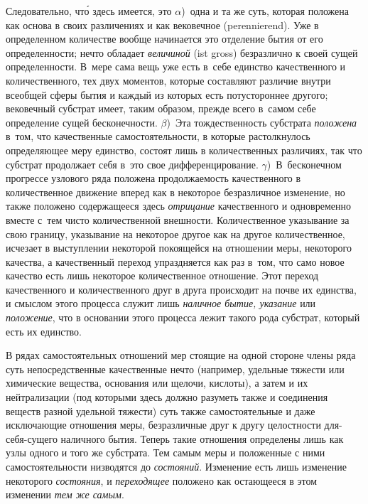 Следовательно, чт\'{о} здесь имеется, это $\alpha$)~одна и та же суть,
которая положена как основа в своих различениях и как вековечное
(peren\-nie\-rend). Уже в определенном количестве вообще начинается это
отделение бытия от его определенности; нечто обладает {\em величиной} (ist
gross) безразлично к своей сущей определенности. В~мере сама вещь уже есть
в~себе единство качественного и количественного, тех двух моментов, которые
составляют различие внутри всеобщей сферы бытия и каждый из которых есть
потустороннее другого; вековечный субстрат имеет, таким образом, прежде всего
в~самом себе определение сущей бесконечности. $\beta$)~Эта тождественность
субстрата {\em положена} в~том, что качественные самостоятельности, в которые
растолкнулось определяющее меру единство, состоят лишь в количественных
различиях, так что субстрат продолжает себя в~это свое дифференцирование.
$\gamma$)~В~бесконечном прогрессе узлового ряда положена продолжаемость
качественного в количественное движение вперед как в некоторое безразличное
изменение, но также положено содержащееся здесь {\em отрицание} качественного и
одновременно вместе с~тем чисто количественной внешности. Количественное
указывание за свою границу, указывание на некоторое другое как на другое
количественное, исчезает в выступлении некоторой покоящейся на отношении меры,
некоторого качества, а качественный переход упраздняется как раз в~том, что
само новое качество есть лишь некоторое количественное отношение. Этот переход
качественного и количественного друг в друга происходит на почве их единства, и
смыслом этого процесса служит лишь {\em наличное бытие, указание} или
{\em положение}, что в основании этого процесса лежит такого рода субстрат,
который есть их единство.

В рядах самостоятельных отношений мер стоящие на одной стороне члены ряда суть
непосредственные качественные нечто (например, удельные тяжести или химические
вещества, основания или щелочи, кислоты), а затем и их нейтрализации (под
которыми здесь должно разуметь также и соединения веществ разной удельной
тяжести) суть также самостоятельные и даже исключающие отношения меры,
безразличные друг к другу целостности для-себя-сущего наличного бытия. Теперь
такие отношения определены лишь как узлы одного и того же субстрата. Тем самым
меры и положенные с ними самостоятельности низводятся до {\em состояний}.
Изменение есть лишь изменение некоторого {\em состояния}, и {\em переходящее}
положено как остающееся в этом изменении {\em тем же самым}.

